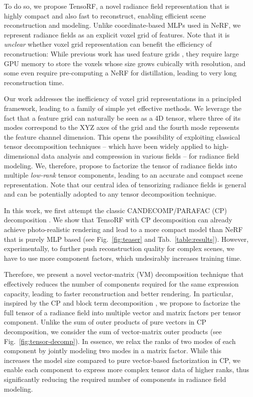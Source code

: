 \documentclass[runningheads]{llncs}
\begin{document}
To do so, we propose TensoRF, a novel radiance field representation that is highly compact and also fast to reconstruct, enabling efficient scene reconstruction and modeling.
Unlike coordinate-based MLPs used in NeRF, we represent radiance fields as an explicit voxel grid of features.
Note that it is \emph{unclear} whether voxel grid representation can benefit the efficiency of reconstruction: While previous work has used feature grids \cite{liu2020neural,yu2021plenoctrees,hedman2021baking}, they require large GPU memory to store the voxels whose size grows cubically with resolution, and some even require pre-computing a NeRF for distillation, leading to very long reconstruction time.

Our work addresses the inefficiency of voxel grid representations in a principled framework, leading to a family of simple yet effective methods.
We leverage the fact that a feature grid can naturally be seen as a 4D tensor, where three of its modes correspond to the XYZ axes of the grid and the fourth mode represents the feature channel dimension.
This opens the possibility of exploiting classical tensor decomposition techniques -- which have been widely applied to high-dimensional data analysis and compression in various fields \cite{kolda2009tensor} --  for radiance field modeling.  We, therefore, propose to factorize the tensor of radiance fields into multiple \emph{low-rank} tensor components, leading to an accurate and compact scene representation.
Note that our central idea of tensorizing radiance fields is general and can be potentially adopted to any tensor decomposition technique. 

In this work, we first attempt the classic CANDECOMP/PARAFAC (CP) decomposition \cite{carroll1970analysis}. We show that TensoRF with CP decomposition can already achieve photo-realistic rendering and lead to a more compact model than NeRF that is purely MLP based (see Fig.~\ref{fig:teaser} and Tab.~\ref{table:results}).
However, experimentally, to further push reconstruction quality for complex scenes, we have to use more component factors, which undesirably increases training time. 

Therefore, we present a novel vector-matrix (VM) decomposition technique that effectively reduces the number of components required for the same expression capacity, leading to faster reconstruction and better rendering.
In particular, inspired by the CP and block term decomposition \cite{de2008decompositions}, we propose to factorize the full tensor of a radiance field into multiple vector and matrix factors per tensor component. 
Unlike the sum of outer products of pure vectors in CP decomposition, we consider the sum of vector-matrix outer products (see Fig.~\ref{fig:tensor-decomp}).
In essence, we relax the ranks of two modes of each component by jointly modeling two modes in a matrix factor.
While this increases the model size compared to pure vector-based factorization in CP, we enable each component to express more complex tensor data of higher ranks, thus significantly reducing the required number of components in radiance field modeling.
\end{document}
